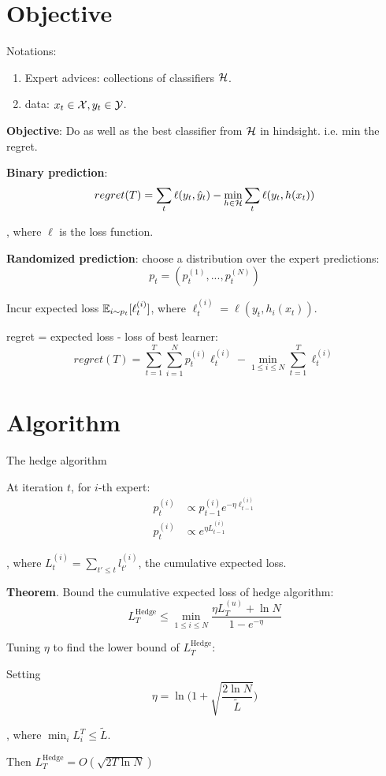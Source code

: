 \documentclass[a4paper]{report}
\begin{document}
\section{Objective}
Notations:
\begin{enumerate}
\item Expert advices: collections of classifiers $\mathcal{H}$.
\item data: $x_t \in \mathcal{X}, y_t \in \mathcal{Y}$.
\end{enumerate}


\textbf{Objective}: Do as well as the best classifier from $\mathcal{H}$ in hindsight. i.e. min the regret. 

\textbf{Binary prediction}:
$$
regret(T) = \sum_t \ell(y_t, \hat y_t) - \min_{h\in \mathcal{H}} \sum_t \ell(y_t, h(x_t))
$$

, where $\ell$ is the loss function. 

\textbf{Randomized prediction}: choose a distribution over the expert predictions: $$
p_t = (p_t^{(1)},...,p_t^{(N)})
$$

Incur expected loss $\mathbb{E}_{i\sim p_t}[\ell_t^{(i)}]$, where $\ell_t^{(i)}=\ell(y_t, h_i(x_t))$.

regret = expected loss - loss of best learner: 
$$
regret(T) = \sum_{t=1}^T \sum_{i=1}^N p_t^{(i)}\ell_t^{(i)} - \min_{1\leq i \leq N}\sum_{t=1}^T\ell_t^{(i)}
$$

\section{Algorithm}
The hedge algorithm

At iteration $t$, for $i$-th expert:
\begin{align*}
p_t^{(i)} &\propto p_{t-1}^{(i)} e^{-\eta \ell_{t-1}^{(i)}} \\
p_t^{(i)} &\propto e^{\eta L_{t-1}^{(i)}}
\end{align*}

, where $L^{(i)}_t = \sum_{t'\leq t} l^{(i)}_{t'}$, the cumulative expected loss. 

\textbf{Theorem}. Bound the cumulative expected loss of hedge algorithm:
$$
L^\text{Hedge}_T\leq \min_{1\leq i \leq N} \frac{\eta L^{(u)}_T+\ln N}{1-e^{-\eta}}
$$

Tuning $\eta$ to find the lower bound of $L^\text{Hedge}_T$:

Setting 
$$
\eta = \ln \Bigg(1+\sqrt{\frac{2\ln N}{\tilde L}}\Bigg)
$$

, where $\min_i L_i^T \leq \tilde L $. 

Then $L_T^\text{Hedge}=O(\sqrt{2T\ln N})$
\end{document}
